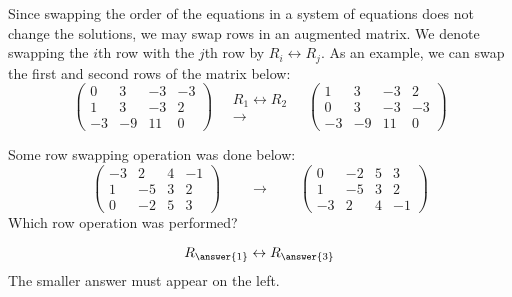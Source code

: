 \documentclass{ximera}
\begin{document}
Since swapping the order of the equations in a
system of equations does not change the solutions, we may swap rows
in an augmented matrix. We denote swapping the $i$th row with the
$j$th row by $R_i\leftrightarrow R_j$. As an example, we can swap
the first and second rows of the matrix below:
\[
  \left(
    \begin{array}{ccc|c}
      0 &   3 & -3 & -3 \\
      1 &   3 & -3 & 2  \\
      -3& -9  & 11 & 0
    \end{array}
  \right)
  \quad
  \begin{array}{c}
    \scriptstyle R_1\leftrightarrow R_2\\\longrightarrow
  \end{array}
  \quad
  \left(
    \begin{array}{ccc|c}
      1 &   3 & -3 & 2  \\
      0 &   3 & -3 & -3 \\
      -3& -9  & 11 & 0
    \end{array}
  \right)
\]

\begin{question}
  Some row swapping operation was done below:
  \[
    \begin{pmatrix}
      -3 & 2 & 4 & -1 \\
      1 & -5 & 3 & 2 \\
      0 & -2 & 5 & 3
    \end{pmatrix}
    \qquad\longrightarrow\qquad
    \begin{pmatrix}
      0 & -2 & 5 & 3 \\
      1 & -5 & 3 & 2 \\
      -3 & 2 & 4 & -1
    \end{pmatrix}
  \]
  Which row operation was performed?
  \begin{prompt}
    \[
      R_{\answer{1}} \leftrightarrow R_{\answer{3}}
    \]
    The smaller answer must appear on the left.
  \end{prompt}
\end{question}
\end{document}
